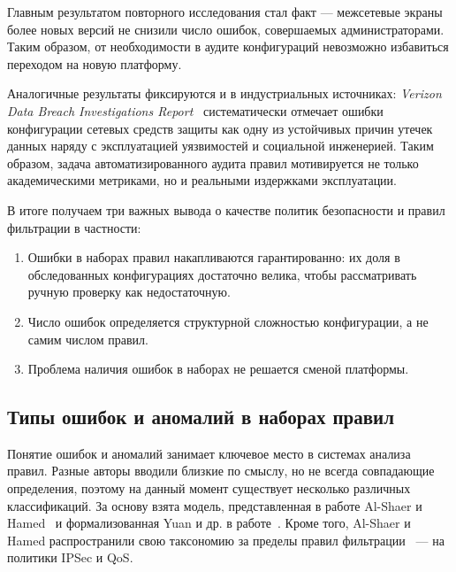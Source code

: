 Главным результатом повторного исследования стал факт --- межсетевые экраны более новых версий не снизили число ошибок, совершаемых администраторами. Таким образом, от необходимости в аудите конфигураций невозможно избавиться переходом на новую платформу.

Аналогичные результаты фиксируются и в индустриальных источниках: \emph{Verizon Data Breach Investigations Report}~\cite{verizon2010data} систематически отмечает ошибки конфигурации сетевых средств защиты как одну из устойчивых причин утечек данных наряду с эксплуатацией уязвимостей и социальной инженерией. Таким образом, задача автоматизированного аудита правил мотивируется не только академическими метриками, но и реальными издержками эксплуатации.

В итоге получаем три важных вывода о качестве политик безопасности и правил фильтрации в частности:

\begin{enumerate}
    \item Ошибки в наборах правил накапливаются гарантированно: их доля в обследованных конфигурациях достаточно велика, чтобы рассматривать ручную проверку как недостаточную.
    \item Число ошибок определяется структурной сложностью конфигурации, а не самим числом правил.
    \item Проблема наличия ошибок в наборах не решается сменой платформы.
\end{enumerate}

\subsection{Типы ошибок и аномалий в наборах правил}
\label{sec:Section2:anomalies}

Понятие ошибок и аномалий занимает ключевое место в системах анализа правил. Разные авторы вводили близкие по смыслу, но не всегда совпадающие определения, поэтому на данный момент существует несколько различных классификаций. За основу взята модель, представленная в работе Al-Shaer и Hamed~\cite{al2003firewall} и формализованная Yuan и др. в работе~\cite{yuan2006fireman}. Кроме того, Al-Shaer и Hamed распространили свою таксономию за пределы правил фильтрации~\cite{hamed2006taxonomy} --- на политики IPSec и QoS.

